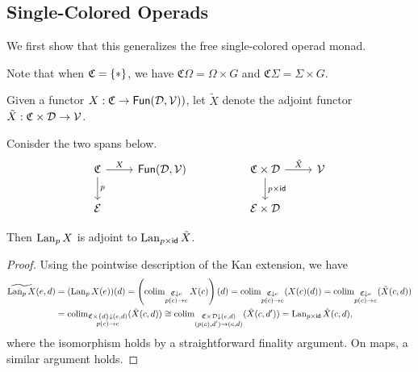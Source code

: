 \documentclass[a4paper,10pt
]{article}%
\renewcommand{\1}{\ensuremath{\mathbb{id}}}
\begin{document}
\subsection{Single-Colored Operads}
We first show that this generalizes the free single-colored operad monad.

Note that when $\mathfrak C = \set{\**}$, we have
$\mathfrak C \Omega = \Omega \times G$ and 
$\mathfrak C \Sigma = \Sigma \times G$.

\begin{notation}
      Given a functor $X : \mathfrak C \to \mathsf{Fun}(\mathcal D, \mathcal V))$,
      let $\tilde X$ denote the adjoint functor $\tilde X: \mathfrak C \times \mathcal D \to \mathcal V$.
\end{notation}

\begin{lemma}
      \label{SPAN_LAN_LEM}
      Conisder the two spans below.
      \begin{equation}
            \begin{tikzcd}
                  \C \arrow[d, "p"] \arrow[r, "X"]
                  &
                  \mathsf{Fun}(\mathcal D, \V)
                  &&
                  \C \times \mathcal D \arrow[d, "p \times \mathsf{id}"] \arrow[r, "\tilde X"]
                  &
                  \V
                  \\
                  \mathcal E
                  &
                  &&
                  \mathcal E \times \mathcal D
            \end{tikzcd}
      \end{equation}
      
      Then $\operatorname{Lan}_p X$ is adjoint to $\operatorname{Lan}_{p \times \mathsf{id}} \tilde X$. 
\end{lemma}
\begin{proof}
      Using the pointwise description of the Kan extension, we have
      \begin{align}
        \widetilde{\operatorname{Lan}_p X}(e,d)
        &= (\operatorname{Lan}_p X(e))(d)
          = \left(
          \operatorname{colim}\limits_{\substack{ \mathfrak C \downarrow e \\ p(c) \to e}} X(c)
        \right)(d)
        = \operatorname{colim}\limits_{\substack{ \mathfrak C \downarrow e \\ p(c) \to e}}(X(c)(d))
        = \operatorname{colim}\limits_{\substack{ \mathfrak C \downarrow e \\ p(c) \to e}}(\tilde X(c,d))\\
        &= \operatorname{colim}\limits_{\substack{ \mathfrak C \times \left\{d\right\} \downarrow (e,d) \\ p(c) \to e}}(\tilde X(c,d))
        \cong \operatorname{colim}\limits_{\substack{ \mathfrak C \times \mathcal D \downarrow (e,d) \\ (p(c),d') \to (e,d)}}(\tilde X(c,d'))
        = \operatorname{Lan}_{p \times \mathsf{id}}\tilde X(c,d),
      \end{align}
      where the isomorphism holds by a straightforward finality argument.
      On maps, a similar argument holds.
\end{proof}
\end{document}
